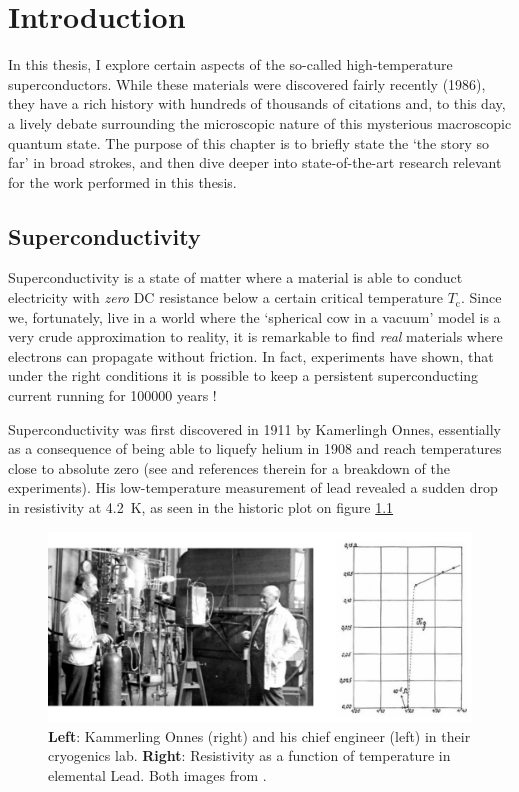 \chapter{Introduction}

In this thesis, I explore certain aspects of the so-called high-temperature superconductors. While these materials were discovered fairly recently (1986), they have a rich history with hundreds of thousands of citations and, to this day, a lively debate surrounding the microscopic nature of this mysterious macroscopic quantum state. The purpose of this chapter is to briefly state the `the story so far' in broad strokes, and then dive deeper into state-of-the-art research relevant for the work performed in this thesis.

\section{Superconductivity}
Superconductivity is a state of matter where a material is able to conduct electricity with \emph{zero} DC resistance below a certain critical temperature $T_\text{c}$. Since we, fortunately, live in a world where the `spherical cow in a vacuum' model is a very crude approximation to reality, it is remarkable to find \emph{real} materials where electrons can propagate without friction. In fact, experiments have shown, that under the right conditions it is possible to keep a persistent superconducting current running for 100000 years \cite{File1963}!

Superconductivity was first discovered in 1911 by Kamerlingh Onnes, essentially as a consequence of being able to liquefy helium in 1908 and reach temperatures close to absolute zero (see \cite{VanDelft2010} and references therein for a breakdown of the experiments). His low-temperature measurement of lead revealed a sudden drop in resistivity at \SI{4.2}{\kelvin}, as seen in the historic plot on figure \ref{fig:onnes}

\begin{figure}
    \centering
    \includegraphics[width=\textwidth]{fig/intro/onnes.png}
    \caption[SC of elemental lead]{\textbf{Left}: Kammerling Onnes (right) and his chief engineer (left) in their cryogenics lab. \textbf{Right}: Resistivity as a function of temperature in elemental Lead. Both images from \cite{VanDelft2010}.}
    \label{fig:onnes}
\end{figure}

